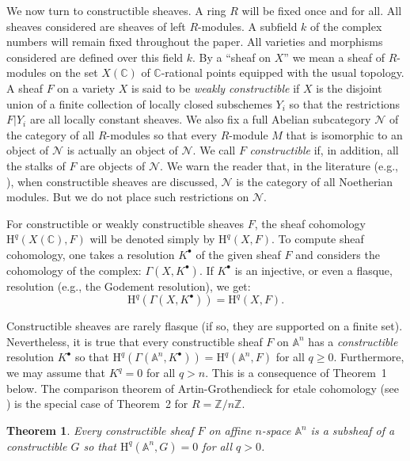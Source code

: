 \documentclass[10pt,twoside]{article}
\newtheorem{thm*}{Theorem}
\newcommand{\Z}{{\mathbb {Z}}}
\newcommand{\homology}{{\mathrm {H}}}
\newcommand{\C}{{\mathbb {C}}}
\newcommand{\A}{{\mathbb {A}}}
\begin{document}
  We now turn to constructible sheaves. A  
ring $R$ will be
fixed once and for all. All sheaves considered are sheaves of 
left $R$-modules.  
A subfield $k$ of the complex numbers will remain fixed throughout the 
paper. All varieties and morphisms considered are defined over this field
$k$. By a  ``sheaf on $X$'' we mean a sheaf of $R$-modules on the set
$X(\C)$ of
$\C$-rational points equipped with the usual topology. A sheaf $F$
on a variety $X$ is said to be \emph{weakly constructible}  
if $X$ is the disjoint union of a
finite collection of locally closed subschemes $Y_i$ so that 
the restrictions $F|Y_i$ are all locally constant sheaves.
We also fix a full Abelian subcategory $\mathcal{N}$ of the category of 
all $R$-modules so that every $R$-module $M$ that is isomorphic to
an object of $\mathcal{N}$ is actually an object of $\mathcal{N}$.
We call $F$ \emph{constructible} if, in addition, 
all the stalks of $F$ are objects of $\mathcal{N}$. 
We warn the reader that, in the literature (e.g., \cite[Chapter~VIII]{nori:KS}),
when constructible sheaves are discussed, 
$\mathcal{N}$ is the category of all Noetherian modules.
But we do not place such restrictions on 
  $\mathcal{N}$.

For constructible or weakly constructible sheaves $F$, the sheaf
cohomology   $\homology^q(X(\C),F)$ will be denoted simply by 
$\homology^q(X,F)$. To compute sheaf cohomology, one
takes a resolution  $K^{\bullet}$ of the given sheaf $F$
and considers 
the cohomology of the complex: $\Gamma (X,K^{\bullet})$. 
If $K^{\bullet}$
is an injective, or even a flasque, resolution (e.g., the Godement
resolution), we get:
$$
\homology^q (\Gamma (X,K^{\bullet}))=\homology^q(X,F).
$$

Constructible sheaves are rarely flasque (if so, they are supported
on a finite set). Nevertheless, it is true that every
constructible sheaf $F$ on $\A^n$ has a \emph{constructible} resolution
 $K^{\bullet}$ so that 
$\homology^q( \Gamma (\A^n,K^{\bullet}))=\homology^q(\A^n,F)$ 
 for all $q \geq 0$. Furthermore, we may assume that
$K^q=0$ for all $q>n$. This is a consequence
of Theorem~1 below.  The comparison theorem of Artin-Grothendieck
for etale cohomology (see \cite[Expose~XI]{nori:SGA4}) is the special case of
Theorem~2 for $R=\Z /n\Z$. 

\begin{thm*} Every constructible  sheaf $F$ on affine $n$-space $\A^n$ 
is a subsheaf of a constructible  $G$ so that $\homology^q(\A^n,G)=0$ for all 
$q>0 $.
\end{thm*}
\end{document}
